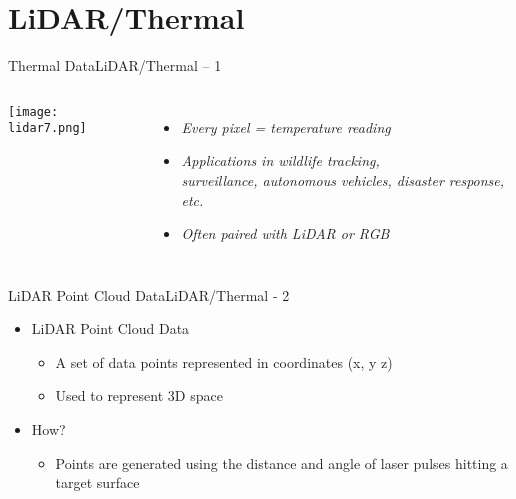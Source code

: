 \documentclass{beamer}
\begin{document}
\section{LiDAR/Thermal}
\begin{frame}{Thermal Data}{LiDAR/Thermal – 1}
\begin{columns}


\centering
\texttt{[image: lidar7.png]}


\begin{itemize}
    \item \textit{Every pixel = temperature reading}
    \item \textit{Applications in wildlife tracking,} \\
          \textit{surveillance, autonomous vehicles, disaster response, etc.}
    \item \textit{Often paired with LiDAR or RGB}
\end{itemize}
\end{columns}
\end{frame}


\begin{frame}{LiDAR Point Cloud Data}{LiDAR/Thermal - 2}
\begin{itemize}
	\item LiDAR Point Cloud Data
	\begin{itemize}
		\item A set of data points represented in coordinates (x, y z)
		\item Used to represent 3D space
	\end{itemize}
	\item How?
	\begin{itemize}
		\item Points are generated using the distance and angle of laser pulses hitting a target surface
	\end{itemize}
\end{itemize}
\end{frame}
\end{document}

